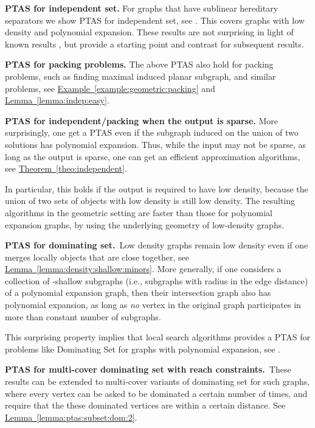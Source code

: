 \documentclass[12pt]{article}
\newlength{\savedparindent}
\newcommand{\SaveIndent}{\setlength{\savedparindent}{\parindent}}
\newcommand{\RestoreIndent}{\setlength{\parindent}{\savedparindent}}
\newcommand{\Term}[1]{\textsf{#1}}
\theoremstyle{remark}\theoremheaderfont{\sf}\theorembodyfont{\upshape}
\numberwithin{figure}{section}\numberwithin{table}{section}\numberwithin{equation}{section}
\newcommand{\HLink}[2]{\hyperref[#2]{#1~\ref*{#2}}}
\newcommand{\exmref}[1]{\HLink{Example}{example:#1}}
\newcommand{\lemref}[1]{\HLink{Lemma}{lemma:#1}}
\newcommand{\thmref}[1]{\HLink{Theorem}{theo:#1}}
\newcommand{\ProblemC}[1]{\textsf{#1}}
\newcommand{\PTAS}{\Term{PTAS}\xspace}
\begin{document}
\smallskip \SaveIndent \begin{compactenum}[(A)]\RestoreIndent \setlength{\itemsep}{3pt}
\item \textbf{\PTAS for independent set.} For graphs that have sublinear hereditary separators we show \PTAS
  for independent set, see . This covers
  graphs with low density and polynomial expansion. These results are
  not surprising in light of known results \cite{ch-aamis-12}, but
  provide a starting point and contrast for subsequent results.

\item \textbf{\PTAS for packing problems.}  The above \PTAS also hold
  for packing problems, such as finding maximal induced planar
  subgraph, and similar problems, see \exmref{geometric:packing} and
  \lemref{indep:easy}.


\item \textbf{\PTAS for independent/packing when the output is
    sparse.} More surprisingly, one get a \PTAS even if the subgraph induced on
  the union of two solutions has polynomial expansion. Thus, while the
  input may not be sparse, as long as the output is sparse, one can
  get an efficient approximation algorithms, see \thmref{independent}.

  In particular, this holds if the output is required to have low
  density, because the union of two sets of objects with low density
  is still low density.  The resulting algorithms in the geometric
  setting are faster than those for polynomial expansion graphs, by
  using the underlying geometry of low-density graphs.


\item \textbf{\PTAS for dominating set.}~Low density graphs remain low density even if one merges locally
  objects that are close together, see
  \lemref{density:shallow:minors}. More generally, if one considers a
  collection of -shallow subgraphs (i.e., subgraphs with radius 
  in the edge distance) of a polynomial expansion graph, then their
  intersection graph also has polynomial expansion, as long as
  \emph{no} vertex in the original graph participates in more than
  constant number of subgraphs.

  This surprising property implies that local search algorithms
  provides a \PTAS for problems like \ProblemC{Dominating Set} for
  graphs with polynomial expansion, see .

\item \textbf{\PTAS for multi-cover dominating set with reach
    constraints.}~These results can be extended to multi-cover variants of dominating
  set for such graphs, where every vertex can be asked to be dominated
  a certain number of times, and require that the these dominated
  vertices are within a certain distance.  See
  \lemref{ptas:subset:dom:2}.


\end{compactenum}
\end{document}
